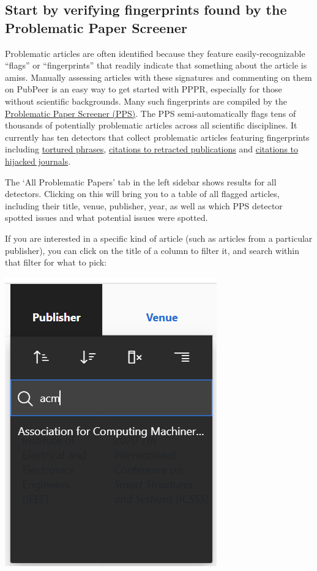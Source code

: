 \documentclass[letterpaper, 12pt]{article}
\begin{document}
\subsection*{Start by verifying fingerprints found by the Problematic Paper Screener}

Problematic articles are often identified because they feature easily-recognizable ``flags'' or ``fingerprints'' that readily indicate that something about the article is amiss. Manually assessing articles with these signatures and commenting on them on PubPeer is an easy way to get started with PPPR, especially for those without scientific backgrounds. Many such fingerprints are compiled by the \href{https://www.irit.fr/~Guillaume.Cabanac/problematic-paper-screener/}{Problematic Paper Screener (PPS)}. The PPS semi-automatically flags tens of thousands of potentially problematic articles across all scientific disciplines. It currently has ten detectors that collect problematic articles featuring fingerprints including \href{https://www.irit.fr/~Guillaume.Cabanac/problematic-paper-screener/tortured}{tortured phrases}, \href{https://www.irit.fr/~Guillaume.Cabanac/problematic-paper-screener/feet-of-clay}{citations to retracted publications} and \href{https://www.irit.fr/~Guillaume.Cabanac/problematic-paper-screener/citejacked}{citations to hijacked journals}. 

The `All Problematic Papers' tab in the left sidebar shows results for all detectors. Clicking on this will bring you to a table of all flagged articles, including their title, venue, publisher, year, as well as which PPS detector spotted issues and what potential issues were spotted.



If you are interested in a specific kind of article (such as articles from a particular publisher), you can click on the title of a column to filter it, and search within that filter for what to pick:

\includegraphics[width=0.3\linewidth]{img/getting_started/Filtering.png}
\end{document}

